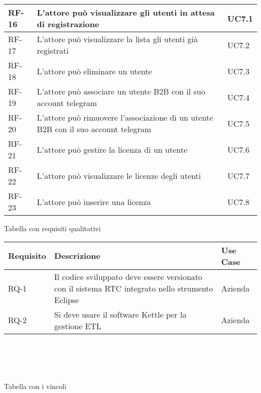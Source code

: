 \begin{table}
\begin{tabular}{ |p{2cm}|p{8cm}|p{2cm}| }
 \hline
   RF-16     & L’attore può visualizzare gli utenti in attesa di registrazione   & UC7.1 \\
\hline
RF-17   & L’attore può visualizzare la lista gli utenti già registrati   & UC7.2 \\
\hline
RF-18   & L’attore può eliminare un utente  & UC7.3 \\
\hline
RF-19   &  L’attore può associare un utente B2B con il suo account telegram  & UC7.4 \\
\hline
RF-20  &  L’attore può rimuovere l’associazione di un utente B2B con il suo account telegram & UC7.5 \\
\hline
RF-21   &  L’attore può gestire la licenza di un utente  & UC7.6 \\
\hline
RF-22   &  L’attore può visualizzare le licenze degli utenti & UC7.7 \\
\hline
RF-23   & L’attore può inserire una  licenza  & UC7.8 \\
\hline
\end{tabular}
\end{table}

Tabella con requisiti qualitativi \\

\begin{tabular}{ |p{2cm}|p{8cm}|p{2cm}| }
 

 \hline
\textbf{ Requisito}   &  \textbf{Descrizione}    &  \textbf{    Use Case} \\ 
\hline
RQ-1  &  Il codice sviluppato deve essere versionato con il sistema RTC integrato nello strumento Eclipse & Azienda \\
\hline
RQ-2 &  Si deve usare il software Kettle per la gestione ETL & Azienda \\
\hline
\end{tabular}
\\ \\ \\ \\

Tabella con i vincoli \\



